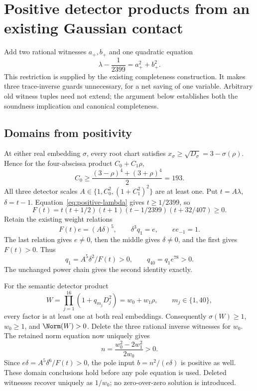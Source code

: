 \section{Positive detector products from an existing Gaussian contact}

Add two rational witnesses $a_+,b_+$ and one quadratic equation
\begin{equation}\label{eq:positive-lambda}
 \lambda-\frac1{2399}=a_+^2+b_+^2.
\end{equation}
This restriction is supplied by the existing completeness construction.
It makes three trace-inverse guards unnecessary, for a net saving of one
variable. Arbitrary old witness tuples need not extend; the argument below
establishes both the soundness implication and canonical completeness.

\subsection{Domains from positivity}
At either real embedding $\sigma$, every root chart satisfies
$x_\sigma\ge\sqrt{D_\sigma}=3-\sigma(\rho)$. Hence for the four-abscissa
product $C_0+C_1\rho$,
\[
 C_0\ge\frac{(3-\rho)^4+(3+\rho)^4}{2}=193.
\]
All three detector scales $A\in\{1,C_0^2,(1+C_1^2)^2\}$ are at least one.
Put $t=A\lambda$, $\delta=t-1$. Equation~\eqref{eq:positive-lambda} gives
$t\ge1/2399$, so
\[
 F(t)=t(t+1/2)(t+1)(t-1/2399)(t+32/407)\ge0.
\]
Retain the existing weight relations
\[
 F(t)e=(A\delta)^5,\qquad \delta^3q_1=e,\qquad ee_{-1}=1.
\]
The last relation gives $e\ne0$, then the middle gives $\delta\ne0$, and
the first gives $F(t)>0$. Thus
\[
 q_1=A^5\delta^2/F(t)>0,\qquad q_{40}=q_1e^{78}>0.
\]
The unchanged power chain gives the second identity exactly.

For the semantic detector product
\[
 W=\prod_{j=1}^{16}(1+q_{m_j}D_j^2)=w_0+w_1\rho,
 \qquad m_j\in\{1,40\},
\]
every factor is at least one at both real embeddings. Consequently
$\sigma(W)\ge1$, $w_0\ge1$, and $\Norm(W)>0$. Delete the three rational
inverse witnesses for $w_0$. The retained norm equation now uniquely gives
\[
 n=\frac{w_0^2-2w_1^2}{2w_0}>0.
\]
Since $e\delta=A^5\delta^6/F(t)>0$, the pole input
$b=n^2/(e\delta)$ is positive as well. These domain conclusions hold
before any pole equation is used. Deleted witnesses recover uniquely as
$1/w_0$; no zero-over-zero solution is introduced.

